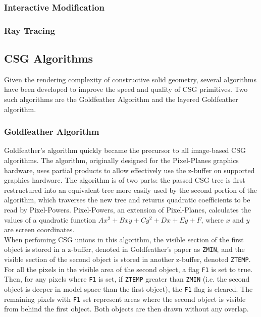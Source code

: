 \documentclass[12pt]{article}
\begin{document}
\begin{doublespace}
\subsubsection{Interactive Modification}
\subsubsection{Ray Tracing}
\subsection{CSG Algorithms}
Given the rendering complexity of constructive solid geometry, several algorithms have been developed to improve the speed and quality of CSG primitives. Two such algorithms are the Goldfeather Algorithm and the layered Goldfeather algorithm.

\subsubsection{Goldfeather Algorithm}
Goldfeather's algorithm quickly became the precursor to all image-based CSG algorithms\cite{hardware_csg}. The algorithm, originally designed for the Pixel-Planes graphics hardware, uses partial products to allow effectively use the z-buffer on supported graphics hardware. The algorithm is of two parts: the passed CSG tree is first restructured into an equivalent tree more easily used by the second portion of the algorithm, which traverses the new tree and returns quadratic coefficients to be read by Pixel-Powers\cite{gold}. Pixel-Powers, an extension of Pixel-Planes, calculates the values of a quadratic function $Ax^2 + Bxy + Cy^2 + Dx + Ey + F$, where $x$ and $y$ are screen coordinates.\\

When perfoming CSG unions in this algorithm, the visible section of the first object is stored in a z-buffer, denoted in Goldfeather's paper as \texttt{ZMIN}, and the visible section of the second object is stored in another z-buffer, denoted \texttt{ZTEMP}. For all the pixels in the visible area of the second object, a flag \texttt{F1} is set to true. Then, for any pixels where \texttt{F1} is set, if \texttt{ZTEMP} greater than \texttt{ZMIN} (i.e. the second object is deeper in model space than the first object), the \texttt{F1} flag is cleared. The remaining pixels with \texttt{F1} set represent areas where the second object is visible from behind the first object. Both objects are then drawn without any overlap.\\


\end{doublespace}
\end{document}
